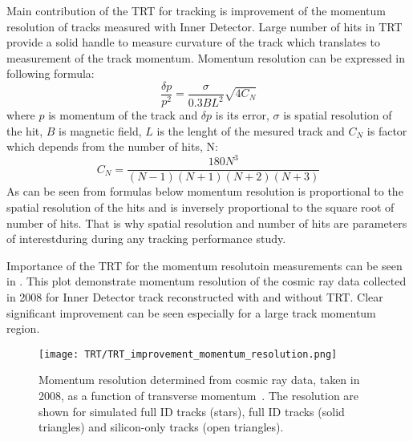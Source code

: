 Main contribution of the TRT for tracking is improvement of the momentum resolution of tracks measured with Inner Detector. Large number of hits in TRT provide
a solid handle to measure curvature of the track which translates to measurement of the track momentum. Momentum resolution can be expressed in following formula:
\begin{equation}
 \dfrac{\delta p}{p^2} = \dfrac{\sigma}{0.3BL^2}\sqrt{4C_N}
 \label{eq:momentum_resolution}
\end{equation}
where $p$ is momentum of the track and $\delta p$ is its error, $\sigma$ is spatial resolution of the hit, $B$ is magnetic field, $L$ is the lenght of the mesured track
and $C_N$ is factor which depends from the number of hits, N:
\begin{equation}
 C_N = \dfrac{180N^3}{(N-1)(N+1)(N+2)(N+3)}
\end{equation}
As can be seen from formulas below momentum resolution is proportional to the spatial resolution of the hits and is inversely proportional to the square root of 
number of hits. That is why spatial resolution and number of hits are parameters of interestduring during any tracking performance study.

Importance of the TRT for the momentum resolutoin measurements can be seen in .
This plot demonstrate momentum resolution of the cosmic ray data collected in 2008 for Inner Detector track reconstructed with and without TRT.
Clear significant improvement can be seen especially for a large track momentum region.

\begin{figure}
\centering
\texttt{[image: TRT/TRT\_improvement\_momentum\_resolution.png]}
\caption{ 
Momentum resolution determined from cosmic ray data, taken in 2008, as a function of transverse momentum~\cite{Aad:2010bx}.
The resolution are shown for simulated full ID tracks (stars), full ID tracks (solid triangles) and silicon-only tracks (open triangles).
}
\label{fig:improvement_of_momentum_resolution}
\end{figure}



